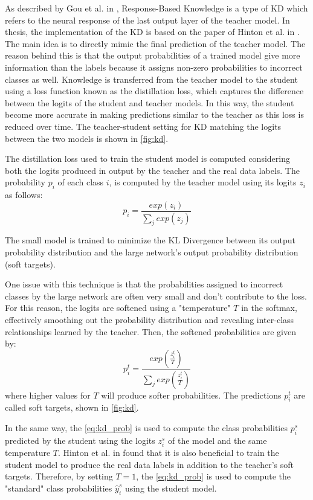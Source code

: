 As described by Gou et al. in \cite{gou2021knowledge},
Response-Based Knowledge is a type of KD which refers to the neural
response of the last output layer of the teacher model.
In thesis, the implementation of the KD is based on the paper of Hinton et al. in \cite{hinton2015distilling}.
The main idea is to directly mimic the final prediction
of the teacher model.
The reason behind this is that the output probabilities of a trained model give more information than the labels because it assigns non-zero probabilities to incorrect classes as well.
Knowledge is transferred from the teacher model to the student using a loss function known as the distillation loss, which captures the difference between the logits of the student and teacher models. In this way, the student become more accurate in making predictions similar to the teacher as this loss is reduced over time. The teacher-student setting for KD matching the logits between the two models is shown in \autoref{fig:kd}.

The distillation loss used to train the student model is computed considering both the logits produced in output by the teacher and the real data labels.
The probability $p_i$ of each class $i$, is computed by the teacher model using its logits $z_i$ as follows:
\begin{equation}
    p_i = \frac{exp(z_i)}{\sum_j exp(z_j)}
\end{equation}

The small model is trained to minimize the KL Divergence between its output probability distribution and the large network's output probability distribution (soft targets).

One issue with this technique is that the probabilities assigned to incorrect classes by the large network are often very small and don't contribute to the loss. For this reason, the logits are softened using a "temperature" $T$ in the softmax, effectively smoothing out the probability distribution and revealing inter-class relationships learned by the teacher. Then, the softened probabilities are given by:
\begin{equation}\label{eq:kd_prob}
    p_i^t = \frac{exp(\frac{z_i^t}{T})}{\sum_j exp(\frac{z_i^t}{T})}
\end{equation}
where higher values for $T$ will produce softer probabilities. The predictions $p_i^t$ are called soft targets, shown in \autoref{fig:kd}.

In the same way, the \autoref{eq:kd_prob} is used to compute the class probabilities $p_i^s$ predicted by the student using the logits $z_i^s$ of the model and the same temperature $T$. Hinton et al. in \cite{hinton2015distilling} found that it is also beneficial to train the student model to produce the real data labels in addition to the teacher's soft targets. Therefore, by setting $T = 1$, the \autoref{eq:kd_prob} is used to compute the "standard" class probabilities $\hat{y}_i^s$ using the student model.

